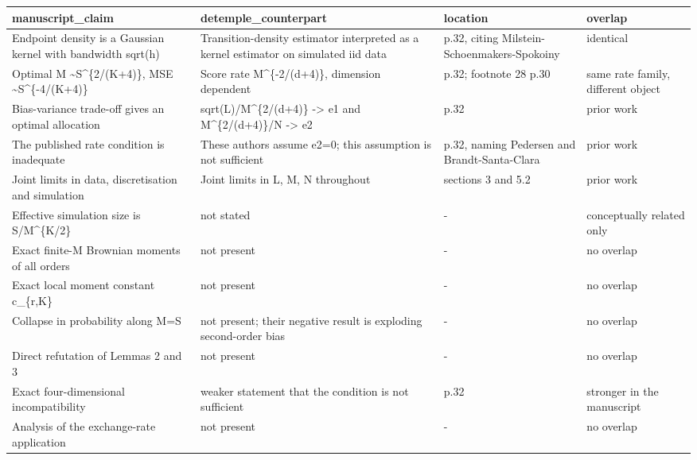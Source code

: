 \begin{tabular}{p{3.2cm}p{3.2cm}p{2.0cm}p{2.2cm}}
\toprule
manuscript\_claim & detemple\_counterpart & location & overlap \\
\midrule
Endpoint density is a Gaussian kernel with bandwidth sqrt(h) & Transition-density estimator interpreted as a kernel estimator on simulated iid data & p.32, citing Milstein-Schoenmakers-Spokoiny & identical \\
Optimal M \textasciitilde \space S\textasciicircum \{2/(K+4)\}, MSE \textasciitilde \space S\textasciicircum \{-4/(K+4)\} & Score rate M\textasciicircum \{-2/(d+4)\}, dimension dependent & p.32; footnote 28 p.30 & same rate family, different object \\
Bias-variance trade-off gives an optimal allocation & sqrt(L)/M\textasciicircum \{2/(d+4)\} -> e1 and M\textasciicircum \{2/(d+4)\}/N -> e2 & p.32 & prior work \\
The published rate condition is inadequate & These authors assume e2=0; this assumption is not sufficient & p.32, naming Pedersen and Brandt-Santa-Clara & prior work \\
Joint limits in data, discretisation and simulation & Joint limits in L, M, N throughout & sections 3 and 5.2 & prior work \\
Effective simulation size is S/M\textasciicircum \{K/2\} & not stated & - & conceptually related only \\
Exact finite-M Brownian moments of all orders & not present & - & no overlap \\
Exact local moment constant c\_\{r,K\} & not present & - & no overlap \\
Collapse in probability along M=S & not present; their negative result is exploding second-order bias & - & no overlap \\
Direct refutation of Lemmas 2 and 3 & not present & - & no overlap \\
Exact four-dimensional incompatibility & weaker statement that the condition is not sufficient & p.32 & stronger in the manuscript \\
Analysis of the exchange-rate application & not present & - & no overlap \\
\bottomrule
\end{tabular}
